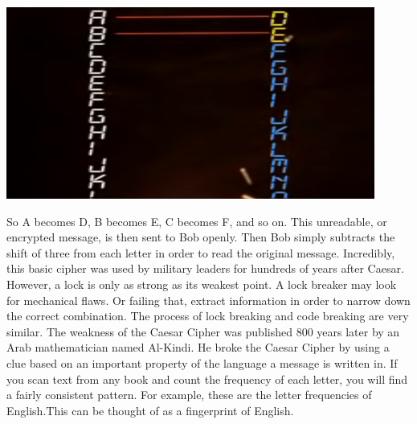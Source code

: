 \documentclass{report}
\begin{document}
\begin{center}
	\includegraphics[scale=1]{1.png}
\end{center}
So A becomes D, B becomes E, C becomes F, and so on. This unreadable, or encrypted message, is then sent to Bob openly. Then Bob simply subtracts the shift of three from each letter in order to read the original message. Incredibly, this basic cipher was used by military leaders for hundreds of years after Caesar.
However, a lock is only as strong as its weakest point. A lock breaker may look for mechanical flaws. Or failing that, extract information in order to narrow down the correct combination. The process of lock breaking and code breaking are very similar. The weakness of the Caesar Cipher was published 800 years later by an Arab mathematician named Al-Kindi. He broke the Caesar Cipher by using a clue based on an important property of the language a message is written in.
If you scan text from any book and count the frequency of each letter, you will find a fairly consistent pattern.
For example, these are the letter frequencies of English.This can be thought of as a fingerprint of English.
\end{document}
